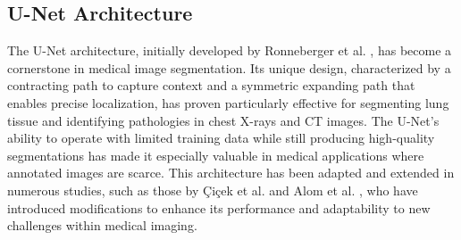 \subsection{U-Net Architecture}
The U-Net architecture, initially developed by Ronneberger et al. \cite{Ronneberger2015}, has become a cornerstone in medical image segmentation. Its unique design, characterized by a contracting path to capture context and a symmetric expanding path that enables precise localization, has proven particularly effective for segmenting lung tissue and identifying pathologies in chest X-rays and CT images. The U-Net's ability to operate with limited training data while still producing high-quality segmentations has made it especially valuable in medical applications where annotated images are scarce. This architecture has been adapted and extended in numerous studies, such as those by Çiçek et al. \cite{Cicek2016} and Alom et al. \cite{Alom2018}, who have introduced modifications to enhance its performance and adaptability to new challenges within medical imaging.